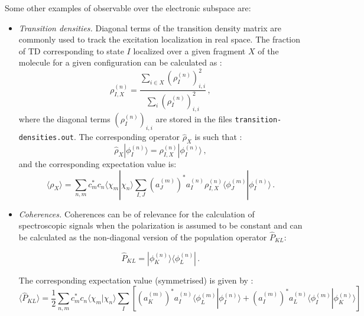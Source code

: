 Some other examples of observable over the electronic subspace are:
\begin{itemize}
    \item \textit{Transition densities.} Diagonal terms of the transition density matrix are commonly used to track the excitation localization in real space. The fraction of TD corresponding to state $I$ localized over a given fragment $X$ of the molecule for a given configuration can be calculated as \cite{freixas2018ab}:
    \begin{equation}
        \rho_{I,X}^{(n)} = \frac{\sum_{i\in X}\left(\rho_I^{(n)}\right)^2_{i,i}}{\sum_{i}\left(\rho_I^{(n)}\right)^2_{i,i}}\,,
    \end{equation}
    where the diagonal terms $\left(\rho_I^{(n)}\right)_{i,i}$ are stored in the files \verb+transition-densities.out+. The corresponding operator $\hat\rho_X$ is such that \cite{freixas2022ultrafast}:
    \begin{equation}
        \hat\rho_X|\phi_I^{(n)}\rangle=\rho_{I,X}^{(n)}|\phi_I^{(n)}\rangle\,,
    \end{equation}
    and the corresponding expectation value is:
    \begin{equation}
        \langle\rho_X\rangle = \sum_{n,m}c_m^*c_n\langle\chi_m|\chi_n\rangle\sum_{I,J}\left(a_J^{(m)}\right)^*a_I^{(n)}\rho_{I,X}^{(n)}\langle\phi_J^{(m)}|\phi_I^{(n)}\rangle\,.
    \end{equation}
    
    \item \textit{Coherences.} Coherences can be of relevance for the calculation of spectroscopic signals when the polarization is assumed to be constant \cite{keefer2021monitoring,freixas2022ultrafast} and can be calculated as the non-diagonal version of the population operator $\hat P_{KL}$:
    
    \begin{equation}
        \hat P_{KL} = |\phi_K^{(n)}\rangle\langle\phi_L^{(n)}|\,.\label{popKL}
    \end{equation}
    
    The corresponding expectation value (symmetrised) is given by \cite{keefer2021monitoring}:
    \begin{equation}
        \langle\hat P_{KL}\rangle = \frac{1}{2}\sum_{n,m}c_m^*c_n\langle\chi_m|\chi_n\rangle\sum_{I}\left[\left(a_K^{(m)}\right)^*a_I^{(n)}\langle\phi_L^{(m)}|\phi_I^{(n)}\rangle+\left(a_I^{(m)}\right)^*a_L^{(n)}\langle\phi_I^{(m)}|\phi_K^{(n)}\rangle\right]
    \end{equation}
    

\end{itemize}
